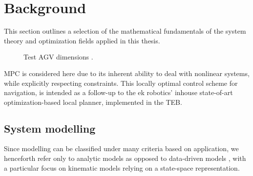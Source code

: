 \chapter{Background}\label{chap:background}

This section outlines a selection of the mathematical fundamentals of the system theory and optimization fields applied in this thesis. 
\begin{figure}[h!tbp]
    \begin{center}
        \def\svgwidth{0.5\textwidth}
        
        \caption{Test AGV dimensions \cite{malitzky_markus_mechanical_nodate}.}
        \label{mpc_agv}
    \end{center}
\end{figure}

\par MPC is considered here due to its inherent ability to deal with nonlinear systems, while explicitly respecting constraints. This locally optimal control scheme for navigation, is intended as a follow-up to the ek robotics' inhouse state-of-art optimization-based local planner, implemented in the \ac{TEB}.

\section{System modelling} \label{back_modelling}
Since modelling can be classified under many criteria based on application, we henceforth refer only to analytic models as opposed to data-driven models \cite{frison_model_nodate}, with a particular focus on kinematic models relying on a state-space representation. 
